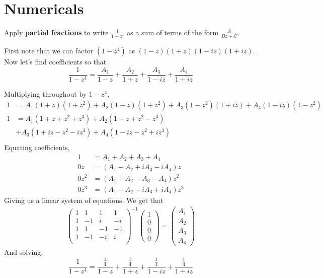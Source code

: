 \documentclass{homework}
\begin{document}
\section{Numericals}
\begin{problem}
Apply \textbf{partial fractions} to write $\displaystyle\frac{1}{1-z^4}$ as a sum of terms of the form $\displaystyle\frac{A}{Bz + C}$.
\end{problem}
\begin{solution}
First note that we can factor $(1-z^4)$ as $(1-z)(1+z)(1-iz)(1+iz)$. Now let's find coefficients so that 
$$\frac{1}{1-z^4} = \frac{A_1}{1-z} + \frac{A_2}{1+z} + \frac{A_3}{1-iz} + \frac{A_4}{1+iz}$$

Multiplying throughout by $1-z^4$,
\begin{align*}
1 &= A_1(1+z)(1+z^2) + A_2(1-z)(1+z^2) + A_3(1-z^2)(1+iz) + A_4(1-iz)(1-z^2)\\
1 &= A_1(1+z+z^2+z^3) + A_2(1-z+z^2-z^3) \\&+A_3(1+iz-z^2-iz^3) + A_4(1-iz-z^2+iz^3)\\
\end{align*}
Equating coefficients,
\begin{align}
1 &= A_1+A_2+A_3+A_4\\
0z &= (A_1 - A_2 + iA_3 - iA_4)z\\
0z^2 &= (A_1 + A_2 - A_3 - A_4)z^2\\
0z^3 &= (A_1 - A_2 - iA_3 + iA_4)z^3
\end{align}
Giving us a linear system of equations. We get that
\begin{align}
\begin{pmatrix}1&1&1&1\\1&-1&i&-i\\1&1&-1&-1\\1&-1&-i&i\\\end{pmatrix}^{-1}
\begin{pmatrix}1\\0\\0\\0\end{pmatrix} = \begin{pmatrix}
A_1\\A_2\\A_3\\A_4\end{pmatrix}
\end{align}
And solving, 
$$\frac{1}{1-z^4} = \frac{\frac{1}{4}}{1-z} + \frac{\frac{1}{4}}{1+z} + \frac{\frac{1}{4}}{1-iz} + \frac{\frac{1}{4}}{1+iz}$$
\end{solution}
\end{document}
